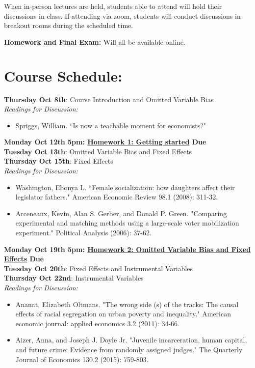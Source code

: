 \documentclass[a4paper, 10pt]{article}
\begin{document}
\noindent When in-person lectures are held, students able to attend will hold their discussions in class. If attending via zoom, students will conduct discussions in breakout rooms during the scheduled time. 


\noindent\textbf{Homework and Final Exam:} Will all be available online. 




 



\section*{Course Schedule:}


\textbf{Thursday Oct 8th}:  Course Introduction and Omitted Variable Bias\\
\textit{Readings for Discussion:}
\begin{itemize}
\item  Spriggs, William. ``Is now a teachable moment for economists?"
\end{itemize}

\noindent\textbf{Monday Oct 12th 5pm: \underline{Homework 1: Getting started} Due}\\

\noindent \textbf{Tuesday Oct 13th}: Omitted Variable Bias  and  Fixed Effects\\

\noindent\textbf{Thursday Oct 15th}: Fixed Effects\\
\textit{Readings for Discussion:}
\begin{itemize}
\item  Washington, Ebonya L. ``Female socialization: how daughters affect their legislator fathers." American Economic Review 98.1 (2008): 311-32. 
\item  Arceneaux, Kevin, Alan S. Gerber, and Donald P. Green. "Comparing experimental and matching methods using a large-scale voter mobilization experiment." Political Analysis (2006): 37-62.
\end{itemize}

\noindent\textbf{Monday Oct 19th 5pm: \underline{Homework 2: Omitted Variable Bias and Fixed Effects} Due}\\

\noindent\textbf{Tuesday Oct 20th}: Fixed Effects and Instrumental Variables\\

\noindent\textbf{Thursday Oct 22nd}: Instrumental Variables\\
\textit{Readings for Discussion:}
\begin{itemize}
\item Ananat, Elizabeth Oltmans. "The wrong side (s) of the tracks: The causal effects of racial segregation on urban poverty and inequality." American economic journal: applied economics 3.2 (2011): 34-66. 
\item Aizer, Anna, and Joseph J. Doyle Jr. "Juvenile incarceration, human capital, and future crime: Evidence from randomly assigned judges." The Quarterly Journal of Economics 130.2 (2015): 759-803.

\end{itemize}
\end{document}
